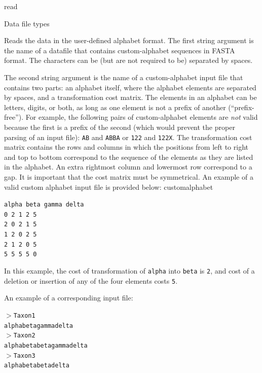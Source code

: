 \begin{command}{read}{}
\begin{arguments}
\begin{argumentgroup}{Data file types}
            {Reads the data in the user-defined alphabet format. The first string argument is
            the name of a datafile that contains custom-alphabet sequences in FASTA format. 
            The characters can be (but are not required to be) separated by spaces.
            
            The second string argument is the name of a custom-alphabet input file that contains two    	   parts:
            an alphabet itself, where the alphabet elements are separated by spaces, and a
            transformation cost matrix. The elements in an alphabet can be letters, digits, or
            both, as long as one element is not a prefix of another  (``prefix-free''). For
            example, the following pairs of custom-alphabet elements are \emph{not} valid
            because the first is a prefix of the second (which would prevent the proper parsing of
            an input file): \texttt{AB} and \texttt{ABBA} or \texttt{122} and \texttt{122X}.
            The transformation cost matrix contains the rows and columns in which the
            positions from left to right and top to bottom correspond to the sequence of the
            elements as they are listed in the alphabet. An extra rightmost column and lowermost
            row correspond to a gap. It is important that the cost matrix must be symmetrical. An example 
            of a valid custom alphabet input file is provided below:
       	  {customalphabet}
	  
	  \texttt{alpha beta gamma delta \\
            0 2 1 2 5 \\
            2 0 2 1 5 \\
            1 2 0 2 5 \\
            2 1 2 0 5 \\
            5 5 5 5 0}
            
           In this example, the cost of transformation of \texttt{alpha} into \texttt{beta} is \texttt{2},
           and cost of a deletion or insertion of any of the four elements costs \texttt{5}.
           
           An example of a corresponding input file:
       
           \texttt{$>$Taxon1\\
	alphabetagammadelta\\
	$>$Taxon2\\
	alphabetabetagammadelta\\
	$>$Taxon3\\
	alphabetabetadelta}
	
}
\end{argumentgroup}
\end{arguments}
\end{command}
